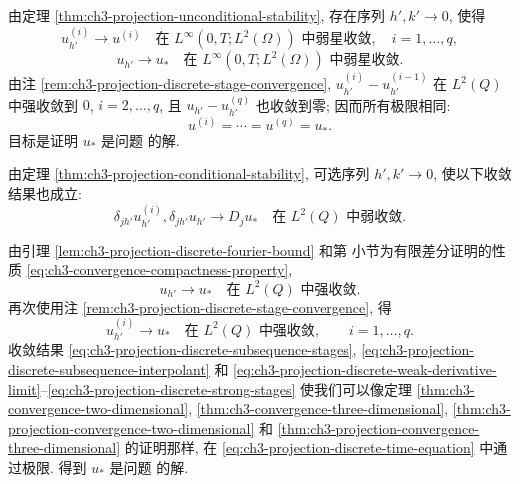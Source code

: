 \begin{Proof}
由定理 \ref{thm:ch3-projection-unconditional-stability}, 存在序列 $h',k'\to0$, 使得
\begin{equation}
u_{h'}^{(i)}\longrightarrow u^{(i)}
\quad\text{在 }L^\infty(0,T;L^2(\Omega))\text{ 中弱星收敛},
\quad i=1,\ldots,q,
\label{eq:ch3-projection-discrete-subsequence-stages}
\end{equation}
\begin{equation}
u_{h'}\longrightarrow u_*
\quad\text{在 }L^\infty(0,T;L^2(\Omega))\text{ 中弱星收敛}.
\label{eq:ch3-projection-discrete-subsequence-interpolant}
\end{equation}
由注 \ref{rem:ch3-projection-discrete-stage-convergence}, $u_{h'}^{(i)}-u_{h'}^{(i-1)}$ 在 $L^2(Q)$ 中强收敛到 $0$, $i=2,\ldots,q$, 且 $u_{h'}-u_{h'}^{(q)}$ 也收敛到零; 因而所有极限相同:
\begin{equation}
u^{(i)}=\cdots=u^{(q)}=u_*.
\label{eq:ch3-projection-discrete-common-limit}
\end{equation}
目标是证明 $u_*$ 是问题  的解.

由定理 \ref{thm:ch3-projection-conditional-stability}, 可选序列 $h',k'\to0$, 使以下收敛结果也成立:
\begin{equation}
\delta_{jh'}u_{h'}^{(i)},\delta_{jh'}u_{h'}
\longrightarrow D_j u_*
\quad\text{在 }L^2(Q)\text{ 中弱收敛}.
\label{eq:ch3-projection-discrete-weak-derivative-limit}
\end{equation}

\hypertarget{chapter-03-page-302-section-07}{}
由引理 \ref{lem:ch3-projection-discrete-fourier-bound} 和第  小节为有限差分证明的性质 \eqref{eq:ch3-convergence-compactness-property},
\begin{equation}
u_{h'}\longrightarrow u_*
\quad\text{在 }L^2(Q)\text{ 中强收敛}.
\label{eq:ch3-projection-discrete-strong-interpolant}
\end{equation}
再次使用注 \ref{rem:ch3-projection-discrete-stage-convergence}, 得
\begin{equation}
u_{h'}^{(i)}\longrightarrow u_*
\quad\text{在 }L^2(Q)\text{ 中强收敛},\qquad i=1,\ldots,q.
\label{eq:ch3-projection-discrete-strong-stages}
\end{equation}
收敛结果 \eqref{eq:ch3-projection-discrete-subsequence-stages}, \eqref{eq:ch3-projection-discrete-subsequence-interpolant} 和 \eqref{eq:ch3-projection-discrete-weak-derivative-limit}--\eqref{eq:ch3-projection-discrete-strong-stages} 使我们可以像定理 \ref{thm:ch3-convergence-two-dimensional}, \ref{thm:ch3-convergence-three-dimensional}, \ref{thm:ch3-projection-convergence-two-dimensional} 和 \ref{thm:ch3-projection-convergence-three-dimensional} 的证明那样, 在 \eqref{eq:ch3-projection-discrete-time-equation} 中通过极限. 得到 $u_*$ 是问题  的解.


\end{Proof}
